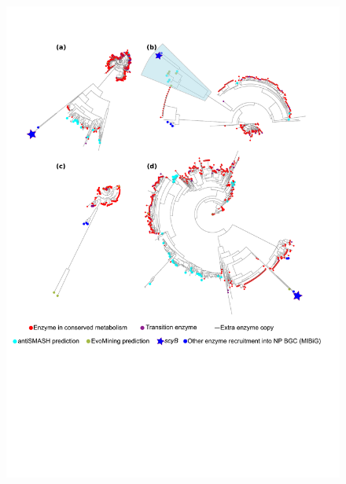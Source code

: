 \documentclass[12pt,twoside]{reedthesis}
\begin{document}
  \begin{figure}[h!tbp]
  \centering
  \includegraphics[angle = 0,scale = .5]{chapter2/FigurasPaper/Figure4.pdf}
  \caption[EvoMining en cuatro linajes genómicos]{\footnotesize{}}
  \label{fig:GenomicLinajes}
  \end{figure}
  
\end{document}
